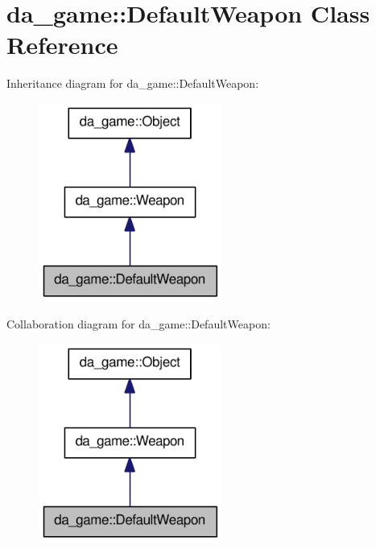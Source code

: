 \hypertarget{classda__game_1_1DefaultWeapon}{
\section{da\_\-game::DefaultWeapon Class Reference}
\label{classda__game_1_1DefaultWeapon}
}
Inheritance diagram for da\_\-game::DefaultWeapon:\nopagebreak
\begin{figure}[H]
\begin{center}
\leavevmode
\includegraphics[width=170pt]{classda__game_1_1DefaultWeapon__inherit__graph}
\end{center}
\end{figure}
Collaboration diagram for da\_\-game::DefaultWeapon:\nopagebreak
\begin{figure}[H]
\begin{center}
\leavevmode
\includegraphics[width=170pt]{classda__game_1_1DefaultWeapon__coll__graph}
\end{center}
\end{figure}
